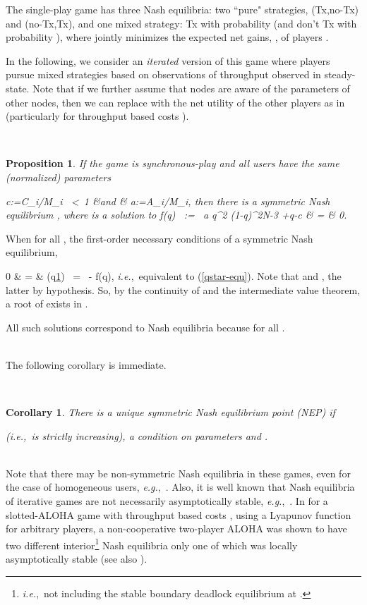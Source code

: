 \documentclass[12pt,onecolumn,draftcls]{IEEEtran}
\newtheorem{corollary}{Corollary}[section]
\newtheorem{proposition}[theorem]{Proposition}
\newcommand{\ie}{{\em i.e.},~}
\newcommand{\eg}{{\em e.g.},~}
\newcommand{\uone}{\underline{1}}
\newcommand{\beqa}{}
\newcommand{\be}{}
\begin{document}
The single-play game has three Nash equilibria: two ``pure" strategies,
(Tx,no-Tx) and (no-Tx,Tx), and  one mixed strategy: Tx with probability
 (and don't Tx with probability ), where
 jointly minimizes the expected net
gains, , of players .  



In the following, we consider an {\em iterated} version of this game
where players pursue mixed strategies based on observations of
throughput  observed in steady-state. 
Note that if we further assume that nodes are aware of the
 parameters of other nodes, then we can replace 
with the net utility of the other players
as in \cite{Kesidis10-cdc} (particularly for
throughput based costs ). 

~

\begin{proposition}
\label{identical-player-game-claim}
If the  game is synchronous-play and all users  have the same
(normalized) parameters 
\beqa
c:=C_i/M_i ~<~1  &\mbox{and} & a:=A_i/M_i,
\eeqa
then there is  a symmetric Nash equilibrium , where
 is a solution to
\be\label{qstar-equ}
f(q) ~:=~ a q^2  (1-q)^{2N-3} +q-c & = & 0.
\ee
\end{proposition}

\begin{IEEEproof}
When  for all ,  
the first-order necessary conditions of a symmetric Nash equilibrium,
\beqa
0 & = &  (q\uone)~ =~ - f(q),
\eeqa
\ie equivalent to (\ref{qstar-equ}).
Note that  and , the latter by hypothesis. 
So, by the continuity of  and the
intermediate value theorem, a root of  exists in . 

All such solutions  correspond to Nash equilibria because
 for all .
\end{IEEEproof}

~\\
The following corollary is immediate.

~\\

\begin{corollary}
There is a unique symmetric Nash equilibrium point (NEP)
if 

(\ie  is strictly increasing), a condition
on parameters  and .  
\end{corollary}



~\\
Note that there may be non-symmetric Nash equilibria in these games,
even for the case of homogeneous users, \eg \cite{JinKes12}.
Also, it is well known that
Nash equilibria of iterative games are not necessarily asymptotically
stable, \eg \cite{Seade80,Levine85,ZhangZhang96}.  In
\cite{Jin02a,Jin02b} for a slotted-ALOHA game with throughput based costs
, using a Lyapunov function for arbitrary  players, a
non-cooperative two-player ALOHA was shown  to have two different
interior\footnote{\ie not including the stable boundary deadlock
equilibrium at .} Nash equilibria only one of which was locally asymptotically
stable (see also \cite{Menache07}). 
\end{document}

